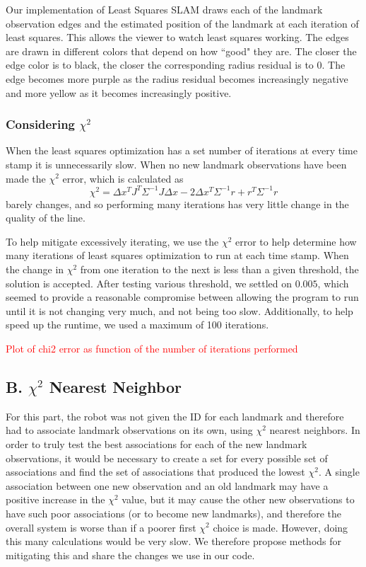 \documentclass[12pt]{article}
\begin{document}
Our implementation of Least Squares SLAM draws each of the landmark observation edges and the estimated position of the landmark at each iteration of least squares.  This allows the viewer to watch least squares working. The edges are drawn in different colors that depend on how ``good" they are.  The closer the edge color is to black, the closer the corresponding radius residual is to 0.  The edge becomes more purple as the radius residual becomes increasingly negative and more yellow as it becomes increasingly positive.

\subsubsection*{Considering $\chi^2$}
When the least squares optimization has a set number of iterations at every time stamp it is unnecessarily slow.  When no new landmark observations have been made the $\chi^2$ error, which is calculated as  
$$\chi^2 = \Delta x^TJ^T\Sigma^{-1}J\Delta x - 2\Delta x^T\Sigma^{-1}r + r^T\Sigma^{-1}r$$
barely changes, and so performing many iterations has very little change in the quality of the line.

To help mitigate excessively iterating, we use the $\chi^2$ error to help determine how many iterations of least squares optimization to run at each time stamp.  When the change in $\chi^2$ from one iteration to the next is less than a given threshold, the solution is accepted.  After testing various threshold, we settled on $0.005$, which seemed to provide a reasonable compromise between allowing the program to run until it is not changing very much, and not being too slow.  Additionally, to help speed up the runtime, we used a maximum of 100 iterations.

\textcolor{red}{Plot of chi2 error as function of the number of iterations performed}


\subsection*{B. $\chi^2$ Nearest Neighbor}

For this part, the robot was not given the ID for each landmark and therefore had to associate landmark observations on its own, using $\chi^2$ nearest neighbors.  In order to truly test the best associations for each of the new landmark observations, it would be necessary to create a set for every possible set of associations and find the set of associations that produced the lowest $\chi^2$.  A single association between one new observation and an old landmark may have a positive increase in the $\chi^2$ value, but it may cause the other new observations to have such poor associations (or to become new landmarks), and therefore the overall system is worse than if a poorer first $\chi^2$ choice is made.  However, doing this many calculations would be very slow.  We therefore propose methods for mitigating this and share the changes we use in our code.
\end{document}
